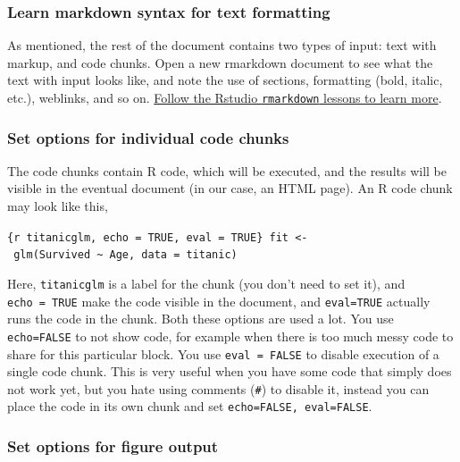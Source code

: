 \documentclass[]{book}
\begin{document}
\hypertarget{learn-markdown-syntax-for-text-formatting}{%
\subsubsection*{Learn markdown syntax for text formatting}\label{learn-markdown-syntax-for-text-formatting}}

As mentioned, the rest of the document contains two types of input: text with markup, and code chunks. Open a new rmarkdown document to see what the text with input looks like, and note the use of sections, formatting (bold, italic, etc.), weblinks, and so on. \href{https://rmarkdown.rstudio.com/lesson-2.html}{Follow the Rstudio \texttt{rmarkdown} lessons to learn more}.

\hypertarget{set-options-for-individual-code-chunks}{%
\subsubsection*{Set options for individual code chunks}\label{set-options-for-individual-code-chunks}}

The code chunks contain R code, which will be executed, and the results will be visible in the eventual document (in our case, an HTML page). An R code chunk may look like this,

\texttt{\{r\ titanicglm,\ echo\ =\ TRUE,\ eval\ =\ TRUE\}\ fit\ \textless{}-\ glm(Survived\ \textasciitilde{}\ Age,\ data\ =\ titanic)}

Here, \texttt{titanicglm} is a label for the chunk (you don't need to set it), and \texttt{echo\ =\ TRUE} make the code visible in the document, and \texttt{eval=TRUE} actually runs the code in the chunk. Both these options are used a lot. You use \texttt{echo=FALSE} to not show code, for example when there is too much messy code to share for this particular block. You use \texttt{eval\ =\ FALSE} to disable execution of a single code chunk. This is very useful when you have some code that simply does not work yet, but you hate using comments (\texttt{\#}) to disable it, instead you can place the code in its own chunk and set \texttt{echo=FALSE,\ eval=FALSE}.

\hypertarget{set-options-for-figure-output}{%
\subsubsection*{Set options for figure output}\label{set-options-for-figure-output}}
\end{document}
